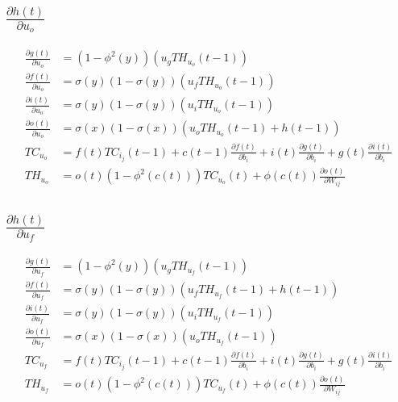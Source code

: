 \documentclass{article}
\begin{document}
\subsection{$\frac{\partial h(t)}{\partial u_{o}}$}

\begin{equation}
\begin{aligned}
\frac{\partial g(t)}{\partial u_{o}} &=  (1-\phi^2(y))(u_g TH_{u_{o}}(t-1))  \\
\frac{\partial f(t)}{\partial u_{o}} &=  \sigma(y)(1-\sigma(y))( u_f TH_{u_{o}}(t-1)) \\
\frac{\partial i(t)}{\partial u_{o}}  &= \sigma(y)(1-\sigma(y))(u_i TH_{u_{o}}(t-1))  \\
\frac{\partial o(t)}{\partial u_{o}} &=  \sigma(x)(1-\sigma(x))( u_o TH_{u_{o}}(t-1) + h(t-1))  \\
TC_{u_{o}}&= f(t) TC_{i_j}(t-1) + c(t-1)\frac{\partial f(t)}{ \partial b_i} + i(t)\frac{\partial g(t) }{\partial b_i}  + g(t)\frac{\partial i(t) }{\partial b_i}  \\
TH_{u_{o}}&= o(t) (1-\phi^{2}(c(t))) TC_{u_{o}}(t)  + \phi(c(t)) \frac{\partial o(t)}{\partial W_{ij}}  
\end{aligned}
\end{equation}

\subsection{$\frac{\partial h(t)}{\partial u_{f}}$}

\begin{equation}
\begin{aligned}
\frac{\partial g(t)}{\partial u_{f}} &=  
(1-\phi^2(y))(u_g TH_{u_{f}}(t-1))  \\
\frac{\partial f(t)}{\partial u_{f}} &=  \sigma(y)(1-\sigma(y))( u_f TH_{u_{f}}(t-1) + h(t-1)) \\
\frac{\partial i(t)}{\partial u_{f}}  &= \sigma(y)(1-\sigma(y))(u_i TH_{u_{f}}(t-1))  \\
\frac{\partial o(t)}{\partial u_{f}} &=  \sigma(x)(1-\sigma(x))( u_o TH_{u_{f}}(t-1))  \\
TC_{u_{f}}&= f(t) TC_{i_j}(t-1) + c(t-1)\frac{\partial f(t)}{ \partial b_i} + i(t)\frac{\partial g(t) }{\partial b_i}  + g(t)\frac{\partial i(t) }{\partial b_i}  \\
TH_{u_{f}}&= o(t) (1-\phi^{2}(c(t))) TC_{u_{f}}(t)  + \phi(c(t)) \frac{\partial o(t)}{\partial W_{ij}}  
\end{aligned}
\end{equation}
\end{document}
